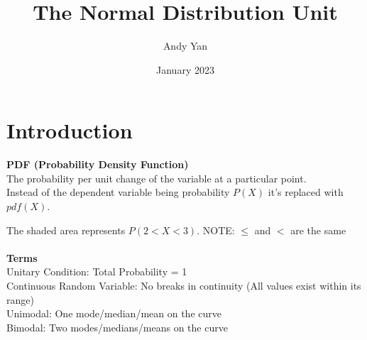 \documentclass{article}
\title{The Normal Distribution Unit}
\author{Andy Yan}
\date{January 2023}
\begin{document}
\maketitle

\section{Introduction}
\large{\textbf{PDF (Probability Density Function)}}\\
The probability per unit change of the variable at a particular point.\\
Instead of the dependent variable being probability \(P(X)\) it's replaced with \(pdf(X)\).\\

\begin{center}
\end{center}
The shaded area represents \(P(2 < X < 3)\). NOTE: \(\leq\) and \(<\) are the same\\\\
\large{\textbf{Terms}}\\
Unitary Condition: Total Probability = 1\\
Continuous Random Variable: No breaks in continuity (All values exist within its range)\\
Unimodal: One mode/median/mean on the curve\\
Bimodal: Two modes/medians/means on the curve\\
\end{document}
